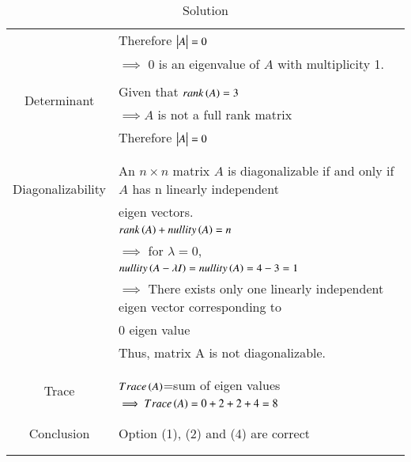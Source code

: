 \begin{longtable}{|c|l|}
	& Therefore $\begin{vmatrix}A\end{vmatrix}=0$\\
	& $\implies$ 0 is an eigenvalue of $A$ with multiplicity 1.\\
	\hline
	\multirow{3}{*}{Determinant} & \\
	& Given that $rank\left(A\right)=3$\\
	& $\implies A$ is not a full rank matrix\\
	& Therefore $\begin{vmatrix}A\end{vmatrix}=0$\\
	&\\
	\hline
    \multirow{3}{*}{Diagonalizability} 
    & \\
    & An $n\times n$ matrix $A$ is diagonalizable if and only if $A$ has n linearly independent \\& eigen vectors.\\
	& $rank\left(A\right)+nullity\left(A\right)=n$\\
	& $\implies$ for $\lambda=0$,\\
	& $nullity\left(A-\lambda I\right)=nullity\left(A\right)=4-3=1$\\
	& $\implies$ There exists only one linearly independent eigen vector corresponding to \\& $0$ eigen value\\
	& Thus, matrix A is not diagonalizable.\\
	&\\
    \hline
    \multirow{3}{*}{Trace} & \\
	& $Trace\left(A\right)$=sum of eigen values\\
	& $\implies Trace\left(A\right)=0+2+2+4=8$\\
	&\\
	\hline
	\multirow{3}{*}{Conclusion} & \\
	& Option (1), (2) and (4) are correct\\
	&\\
	\hline
\caption{Solution}
\label{eq:solutions/2017/june/74/table}
\end{longtable}
